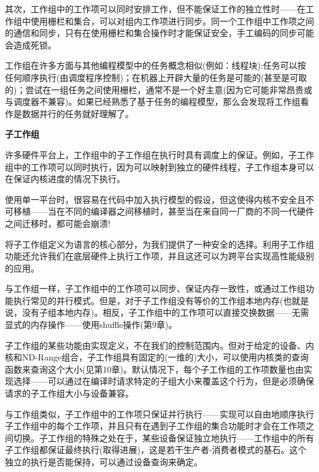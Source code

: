 其次，工作组中的工作项可以同时安排工作，但不能保证工作的独立性时——在工作组中使用栅栏和集合，可以对组内工作项进行同步。同一个工作组中工作项之间的通信和同步，只有在使用栅栏和集合操作时才能保证安全，手工编码的同步可能会造成死锁。\par

\begin{tcolorbox}[colback=blue!5!white,colframe=blue!75!black, title=对于工作组的思考]
工作组在许多方面与其他编程模型中的任务概念相似(例如：线程块):任务可以按任何顺序执行(由调度程序控制)；在机器上开辟大量的任务是可能的(甚至是可取的)；尝试在一组任务之间使用栅栏，通常不是一个好主意(因为它可能非常昂贵或与调度器不兼容)。如果已经熟悉了基于任务的编程模型，那么会发现将工作组看作是数据并行的任务就好理解了。
\end{tcolorbox}

\hspace*{\fill} \par %
\textbf{子工作组}

许多硬件平台上，工作组中的子工作组在执行时具有调度上的保证。例如，子工作组中的工作项可以同时执行，因为可以映射到独立的硬件线程，子工作组本身可以在保证内核进度的情况下执行。\par

使用单一平台时，很容易在代码中加入执行模型的假设，但这使得内核不安全且不可移植——当在不同的编译器之间移植时，甚至当在来自同一厂商的不同一代硬件之间迁移时，都可能会崩溃!\par

将子工作组定义为语言的核心部分，为我们提供了一种安全的选择。利用子工作组功能还允许我们在底层硬件上执行工作项，并且这还可以为跨平台实现高性能级别的应用。\par

与工作组一样，子工作组中的工作项可以同步、保证内存一致性，或通过工作组功能执行常见的并行模式。但是，对于子工作组没有等价的工作组本地内存(也就是说，没有子组本地内存)。相反，子工作组中的工作项可以直接交换数据——无需显式的内存操作——使用shuffle操作(第9章)。\par

子工作组的某些功能由实现定义，不在我们的控制范围内。但对于给定的设备、内核和ND-Range组合，子工作组具有固定的(一维的)大小，可以使用内核类的查询函数来查询这个大小(见第10章)。默认情况下，每个子工作组的工作项数量也由实现选择——可以通过在编译时请求特定的子组大小来覆盖这个行为，但是必须确保请求的子工作组大小与设备兼容。\par

与工作组类似，子工作组中的工作项只保证并行执行——实现可以自由地顺序执行子工作组中的每个工作项，并且只有在遇到子工作组的集合功能时才会在工作项之间切换。子工作组的特殊之处在于，某些设备保证独立地执行——工作组中的所有子工作组都保证最终执行(取得进展)，这是若干生产者-消费者模式的基石。这个独立的执行是否能保持，可以通过设备查询来确定。\par

